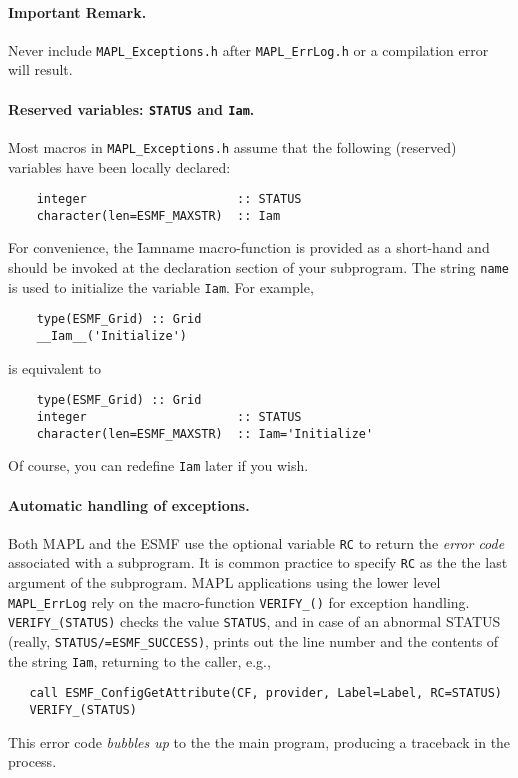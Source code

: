 \paragraph{Important Remark.} Never include {\tt MAPL\_Exceptions.h}
after {\tt MAPL\_ErrLog.h} or a compilation error will result. 

\paragraph{Reserved variables: {\tt STATUS} and {\tt Iam}.} Most
macros in {\tt MAPL\_Exceptions.h} assume that the following
(reserved) variables have been locally declared:
\begin{verbatim}
    integer                     :: STATUS
    character(len=ESMF_MAXSTR)  :: Iam
\end{verbatim}
For convenience, the \f{Iam}{name} macro-function is provided as a
short-hand and should be invoked at the declaration section of your
subprogram. The string {\tt name} is used to initialize the variable
{\tt Iam}. For example,
\begin{verbatim}
    type(ESMF_Grid) :: Grid
    __Iam__('Initialize')
\end{verbatim}
is equivalent to
\begin{verbatim}
    type(ESMF_Grid) :: Grid
    integer                     :: STATUS
    character(len=ESMF_MAXSTR)  :: Iam='Initialize'
\end{verbatim}
Of course, you can redefine {\tt Iam} later if you wish.

\paragraph{Automatic handling of exceptions.}

Both MAPL and the ESMF use the optional variable {\tt RC} to return
the {\em error code} associated with a subprogram. It is common
practice to specify {\tt RC} as the the last argument of the subprogram. MAPL
applications using the lower level {\tt MAPL\_ErrLog} rely on the
macro-function {\tt VERIFY\_()} for exception handling. {\tt
  VERIFY\_(STATUS)} checks the value {\tt STATUS}, and in case of an
abnormal STATUS (really, {\tt STATUS/=ESMF\_SUCCESS)}, prints out the line
number and the contents of the string {\tt Iam}, returning to the caller, e.g.,
\begin{verbatim}
   call ESMF_ConfigGetAttribute(CF, provider, Label=Label, RC=STATUS)
   VERIFY_(STATUS)
\end{verbatim}
This error code {\em bubbles up} to the the main program, producing a
traceback in the process.

